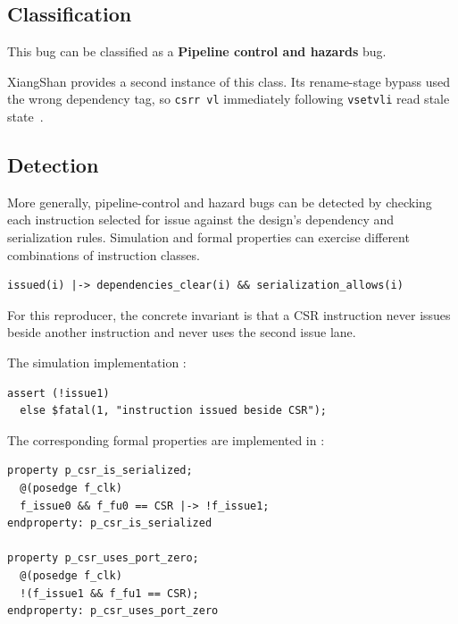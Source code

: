 \documentclass[conference]{IEEEtran}
\begin{document}



\subsection{Classification}

This bug can be classified as a \textbf{Pipeline control and hazards} bug.

XiangShan provides a second instance of this class. Its rename-stage bypass
used the wrong dependency tag, so \texttt{csrr vl} immediately following
\texttt{vsetvli} read stale state~\cite{xiangshan-vl-bug,xiangshan-vl-fix}.




\subsection{Detection}

More generally, pipeline-control and hazard bugs can be detected by checking
each instruction selected for issue against the design's dependency and
serialization rules. Simulation and formal properties can exercise different
combinations of instruction classes.

\begin{lstlisting}
issued(i) |-> dependencies_clear(i) && serialization_allows(i)
\end{lstlisting}

For this reproducer, the concrete invariant is that a CSR instruction
never issues beside another instruction and never uses the second issue lane.

The simulation implementation \cite{bug5-simulation-check}:

\begin{lstlisting}
assert (!issue1)
  else $fatal(1, "instruction issued beside CSR");
\end{lstlisting}

The corresponding formal properties are implemented in
\cite{bug5-formal-check}:

\begin{lstlisting}
property p_csr_is_serialized;
  @(posedge f_clk)
  f_issue0 && f_fu0 == CSR |-> !f_issue1;
endproperty: p_csr_is_serialized

property p_csr_uses_port_zero;
  @(posedge f_clk)
  !(f_issue1 && f_fu1 == CSR);
endproperty: p_csr_uses_port_zero
\end{lstlisting}
\end{document}
